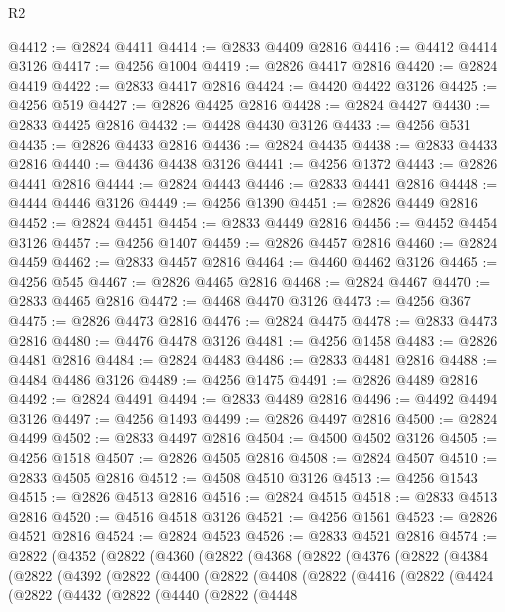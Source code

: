 \begin{lexlean}{R2}
\begin{coremodule}
@4412 := @2824 @4411
@4414 := @2833 @4409 @2816
@4416 := @4412 @4414 @3126
@4417 := @4256 @1004
@4419 := @2826 @4417 @2816
@4420 := @2824 @4419
@4422 := @2833 @4417 @2816
@4424 := @4420 @4422 @3126
@4425 := @4256 @519
@4427 := @2826 @4425 @2816
@4428 := @2824 @4427
@4430 := @2833 @4425 @2816
@4432 := @4428 @4430 @3126
@4433 := @4256 @531
@4435 := @2826 @4433 @2816
@4436 := @2824 @4435
@4438 := @2833 @4433 @2816
@4440 := @4436 @4438 @3126
@4441 := @4256 @1372
@4443 := @2826 @4441 @2816
@4444 := @2824 @4443
@4446 := @2833 @4441 @2816
@4448 := @4444 @4446 @3126
@4449 := @4256 @1390
@4451 := @2826 @4449 @2816
@4452 := @2824 @4451
@4454 := @2833 @4449 @2816
@4456 := @4452 @4454 @3126
@4457 := @4256 @1407
@4459 := @2826 @4457 @2816
@4460 := @2824 @4459
@4462 := @2833 @4457 @2816
@4464 := @4460 @4462 @3126
@4465 := @4256 @545
@4467 := @2826 @4465 @2816
@4468 := @2824 @4467
@4470 := @2833 @4465 @2816
@4472 := @4468 @4470 @3126
@4473 := @4256 @367
@4475 := @2826 @4473 @2816
@4476 := @2824 @4475
@4478 := @2833 @4473 @2816
@4480 := @4476 @4478 @3126
@4481 := @4256 @1458
@4483 := @2826 @4481 @2816
@4484 := @2824 @4483
@4486 := @2833 @4481 @2816
@4488 := @4484 @4486 @3126
@4489 := @4256 @1475
@4491 := @2826 @4489 @2816
@4492 := @2824 @4491
@4494 := @2833 @4489 @2816
@4496 := @4492 @4494 @3126
@4497 := @4256 @1493
@4499 := @2826 @4497 @2816
@4500 := @2824 @4499
@4502 := @2833 @4497 @2816
@4504 := @4500 @4502 @3126
@4505 := @4256 @1518
@4507 := @2826 @4505 @2816
@4508 := @2824 @4507
@4510 := @2833 @4505 @2816
@4512 := @4508 @4510 @3126
@4513 := @4256 @1543
@4515 := @2826 @4513 @2816
@4516 := @2824 @4515
@4518 := @2833 @4513 @2816
@4520 := @4516 @4518 @3126
@4521 := @4256 @1561
@4523 := @2826 @4521 @2816
@4524 := @2824 @4523
@4526 := @2833 @4521 @2816
@4574 := @2822
    (@4352
      (@2822
        (@4360
          (@2822
            (@4368
              (@2822
                (@4376
                  (@2822
                    (@4384
                      (@2822
                        (@4392
                          (@2822
                            (@4400
                              (@2822
                                (@4408
                                  (@2822
                                    (@4416
                                      (@2822
                                        (@4424
                                          (@2822
                                            (@4432
                                              (@2822
                                                (@4440
                                                  (@2822
                                                    (@4448

\end{coremodule}
\end{lexlean}
